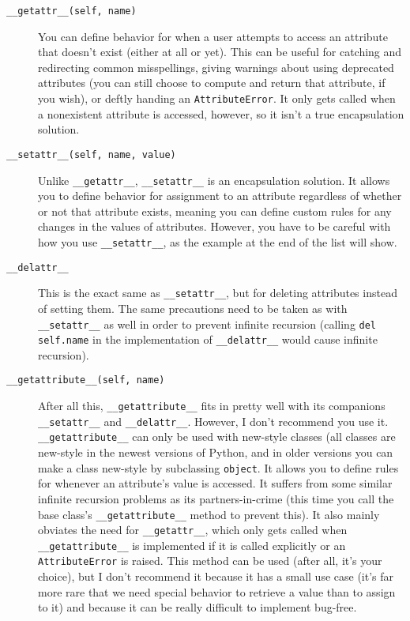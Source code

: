 \documentclass[a4paper,11pt]{article}
\newcommand{\code}[1]{\texttt{#1}}
\begin{document}
\begin{description}

\item[\code{__getattr__(self, name)}]
You can define behavior for when a user attempts to access an attribute that doesn't exist (either at all or yet). This can be useful for catching and redirecting common misspellings, giving warnings about using deprecated attributes (you can still choose to compute and return that attribute, if you wish), or deftly handing an \code{AttributeError}. It only gets called when a nonexistent attribute is accessed, however, so it isn't a true encapsulation solution.

\item[\code{__setattr__(self, name, value)}]
Unlike \code{__getattr__}, \code{__setattr__} is an encapsulation solution. It allows you to define behavior for assignment to an attribute regardless of whether or not that attribute exists, meaning you can define custom rules for any changes in the values of attributes. However, you have to be careful with how you use \code{__setattr__}, as the example at the end of the list will show.

\item[\code{__delattr__}]
This is the exact same as \code{__setattr__}, but for deleting attributes instead of setting them. The same precautions need to be taken as with \code{__setattr__} as well in order to prevent infinite recursion (calling \code{del self.name} in the implementation of \code{__delattr__} would cause infinite recursion).

\item[\code{__getattribute__(self, name)}]
After all this, \code{__getattribute__} fits in pretty well with its companions \code{__setattr__} and \code{__delattr__}. However, I don't recommend you use it. \code{__getattribute__} can only be used with new-style classes (all classes are new-style in the newest versions of Python, and in older versions you can make a class new-style by subclassing \code{object}. It allows you to define rules for whenever an attribute's value is accessed. It suffers from some similar infinite recursion problems as its partners-in-crime (this time you call the base class's \code{__getattribute__} method to prevent this). It also mainly obviates the need for \code{__getattr__}, which only gets called when \code{__getattribute__} is implemented if it is called explicitly or an \code{AttributeError} is raised. This method can be used (after all, it's your choice), but I don't recommend it because it has a small use case (it's far more rare that we need special behavior to retrieve a value than to assign to it) and because it can be really difficult to implement bug-free.

\end{description}
\end{document}
